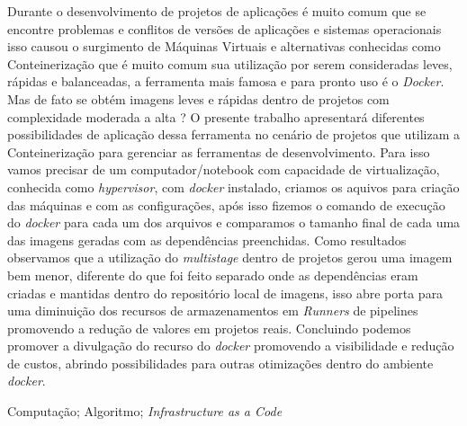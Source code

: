 \documentclass{modelo_resumo_simples}
\begin{document}
	\construirtitulo

	\construirautores
	
	\begin{resumo}	
	Durante o desenvolvimento de projetos de aplicações é muito comum que se encontre problemas e conflitos de versões de aplicações e sistemas operacionais isso causou o surgimento de Máquinas Virtuais e alternativas conhecidas como Conteinerização que é muito comum sua utilização por serem consideradas leves, rápidas e balanceadas, a ferramenta mais famosa e para pronto uso é o \textit{Docker}. 
	Mas de fato se obtém imagens leves e rápidas dentro de projetos com complexidade moderada a alta ? O presente trabalho apresentará diferentes possibilidades de aplicação dessa ferramenta no cenário de projetos que utilizam a Conteinerização para gerenciar as ferramentas de desenvolvimento. 
	Para isso vamos precisar de um computador/notebook com capacidade de virtualização, conhecida como \textit{hypervisor}, com \textit{docker} instalado, criamos os aquivos para criação das máquinas e com as configurações, após isso fizemos o comando de execução do \textit{docker} para cada um dos arquivos e comparamos o tamanho final de cada uma das imagens geradas com as dependências preenchidas. Como resultados observamos que a utilização do \textit{multistage} dentro de projetos gerou uma imagem bem menor, diferente do que foi feito separado onde as dependências eram criadas e mantidas dentro do repositório local de imagens, isso abre porta para uma diminuição dos recursos de armazenamentos em \textit{Runners} de pipelines promovendo a redução de valores em projetos reais. Concluindo podemos promover a divulgação do recurso do \textit{docker} promovendo a visibilidade e redução de custos, abrindo possibilidades para outras otimizações dentro do ambiente \textit{docker}.
	\end{resumo}
	
	\begin{palavras_chave}
	Computação; Algoritmo; \textit{Infrastructure as a Code}
	\end{palavras_chave}
\end{document}
